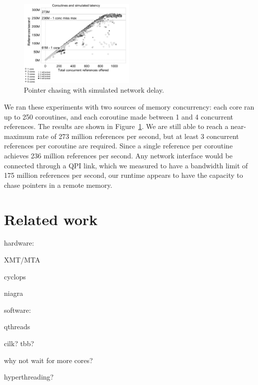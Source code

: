 \documentclass{acm_proc_article-sp}
\begin{document}
\begin{figure}[h]
  \begin{center}
    \includegraphics[width=0.5\textwidth]{figures/multi-green-delay7800-edited.pdf}
  \end{center}
  \caption{Pointer chasing with simulated network delay.}
  \label{fig:network-delay}
\end{figure}

We ran these experiments with two sources of memory concurrency: each
core ran up to 250 coroutines, and each coroutine made between 1 and 4
concurrent references. The results are shown in
Figure~\ref{fig:network-delay}. We are still able to reach a
near-maximum rate of 273 million references per second, but at least 3
concurrent references per coroutine are required. Since a single
reference per coroutine achieves 236 million references per
second. Any network interface would be connected through a QPI link,
which we measured to have a bandwidth limit of 175 million references
per second, our runtime appears to have the capacity to chase pointers
in a remote memory.



%

\section{Related work}


hardware:

XMT/MTA

cyclops

niagra

software:

qthreads

cilk? tbb?

why not wait for more cores?

hyperthreading?
\end{document}
